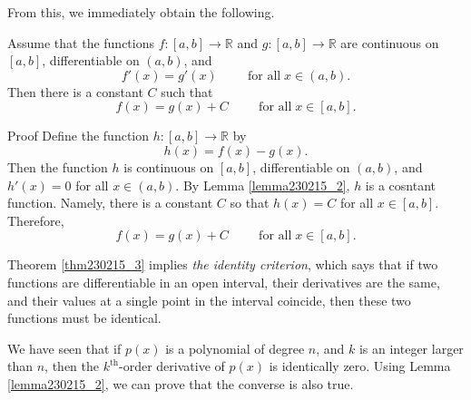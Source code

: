 From this, we immediately obtain the following.
\begin{theorem}[label=thm230215_3]{ }
Assume that the functions $f:[a,b]\to\mathbb{R}$ and $g:[a,b]\to\mathbb{R}$ are continuous on $[a,b]$, differentiable on $(a,b)$, and 
\[f'(x)=g'(x)\hspace{1cm}\text{for all}\;x\in (a,b).\]
Then there is a constant $C$ such that
\[f(x)=g(x)+C\hspace{1cm}\text{for all}\; x\in [a,b].\]
\end{theorem}
\begin{myproof}{Proof}
Define the function $h:[a,b]\to\mathbb{R}$ by
\[h(x)=f(x)-g(x).\] Then the function $h$ is continuous on $[a, b]$, differentiable on $(a,b)$, and $h'(x)=0$ for all $x\in (a,b)$. By Lemma \ref{lemma230215_2}, $h$ is a cosntant function. Namely, there is a constant $C$ so that $h(x)=C$ for all $x\in [a, b]$. Therefore,
\[f(x)=g(x)+C\hspace{1cm}\text{for all}\; x\in [a,b].\]
\end{myproof}

\begin{highlight}{}
Theorem \ref{thm230215_3} implies   \emph{the identity criterion}, which says that if two  functions are differentiable in an open interval, their derivatives are the same, and their values at a single point in the interval coincide, then these two functions must be identical.
\end{highlight}

We have seen that if $p(x)$ is a polynomial of degree $n$, and $k$ is an integer larger than $n$, then the $k^{\text{th}}$-order derivative of $p(x)$ is identically zero. Using Lemma \ref{lemma230215_2}, we can prove that the converse is also true.


